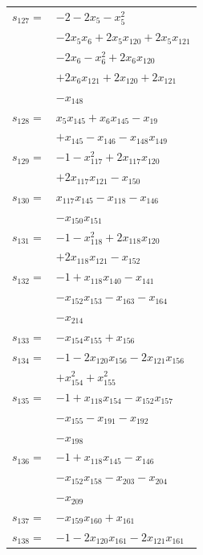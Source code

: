 \begin{longtable}{@{}r@{\;}l@{}}
\(s_{127}=\) & \(\displaystyle -2 -2x_{5} -x_{5}^{2}\) \\
 & \(\displaystyle -2x_{5}x_{6} +2x_{5}x_{120} +2x_{5}x_{121}\) \\
 & \(\displaystyle -2x_{6} -x_{6}^{2} +2x_{6}x_{120}\) \\
 & \(\displaystyle +2x_{6}x_{121} +2x_{120} +2x_{121}\) \\
 & \(\displaystyle -x_{148}\) \\[3pt]
\(s_{128}=\) & \(\displaystyle x_{5}x_{145} +x_{6}x_{145} -x_{19}\) \\
 & \(\displaystyle +x_{145} -x_{146} -x_{148}x_{149}\) \\[3pt]
\(s_{129}=\) & \(\displaystyle -1 -x_{117}^{2} +2x_{117}x_{120}\) \\
 & \(\displaystyle +2x_{117}x_{121} -x_{150}\) \\[3pt]
\(s_{130}=\) & \(\displaystyle x_{117}x_{145} -x_{118} -x_{146}\) \\
 & \(\displaystyle -x_{150}x_{151}\) \\[3pt]
\(s_{131}=\) & \(\displaystyle -1 -x_{118}^{2} +2x_{118}x_{120}\) \\
 & \(\displaystyle +2x_{118}x_{121} -x_{152}\) \\[3pt]
\(s_{132}=\) & \(\displaystyle -1 +x_{118}x_{140} -x_{141}\) \\
 & \(\displaystyle -x_{152}x_{153} -x_{163} -x_{164}\) \\
 & \(\displaystyle -x_{214}\) \\[3pt]
\(s_{133}=\) & \(\displaystyle -x_{154}x_{155} +x_{156}\) \\[3pt]
\(s_{134}=\) & \(\displaystyle -1 -2x_{120}x_{156} -2x_{121}x_{156}\) \\
 & \(\displaystyle +x_{154}^{2} +x_{155}^{2}\) \\[3pt]
\(s_{135}=\) & \(\displaystyle -1 +x_{118}x_{154} -x_{152}x_{157}\) \\
 & \(\displaystyle -x_{155} -x_{191} -x_{192}\) \\
 & \(\displaystyle -x_{198}\) \\[3pt]
\(s_{136}=\) & \(\displaystyle -1 +x_{118}x_{145} -x_{146}\) \\
 & \(\displaystyle -x_{152}x_{158} -x_{203} -x_{204}\) \\
 & \(\displaystyle -x_{209}\) \\[3pt]
\(s_{137}=\) & \(\displaystyle -x_{159}x_{160} +x_{161}\) \\[3pt]
\(s_{138}=\) & \(\displaystyle -1 -2x_{120}x_{161} -2x_{121}x_{161}\) \\

\end{longtable}
